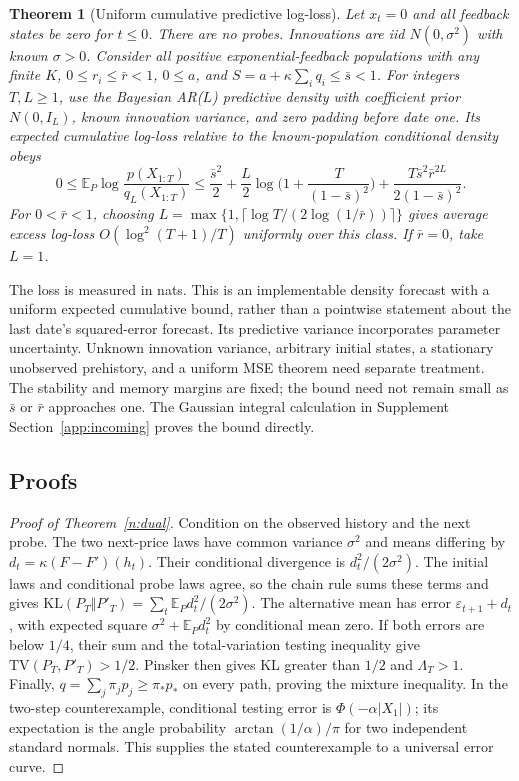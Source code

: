 \documentclass[12pt]{article}
\newtheorem{theorem}{Theorem}[section]
\theoremstyle{definition}
\theoremstyle{remark}
\begin{document}
\begin{theorem}[Uniform cumulative predictive log-loss]\label{n:uniformlog}
Let $x_t=0$ and all feedback states be zero for $t\le0$. There are no probes. Innovations are iid $N(0,\sigma^2)$ with known $\sigma>0$. Consider all positive exponential-feedback populations with any finite $K$, $0\le r_i\le\bar r<1$, $0\le a$, and $S=a+\kappa\sum_iq_i\le\bar s<1$. For integers $T,L\ge1$, use the Bayesian AR($L$) predictive density with coefficient prior $N(0,I_L)$, known innovation variance, and zero padding before date one. Its expected cumulative log-loss relative to the known-population conditional density obeys
\[
0\le\mathbb E_P\log\frac{p(X_{1:T})}{q_L(X_{1:T})}
\le\frac{\bar s^2}{2}+\frac L2\log\Big(1+\frac{T}{(1-\bar s)^2}\Big)
+\frac{T\bar s^2\bar r^{2L}}{2(1-\bar s)^2}.
\]
For $0<\bar r<1$, choosing $L=\max\{1,\lceil\log T/(2\log(1/\bar r))\rceil\}$ gives average excess log-loss $O(\log^2(T+1)/T)$ uniformly over this class. If $\bar r=0$, take $L=1$.
\end{theorem}

The loss is measured in nats. This is an implementable density forecast with a uniform expected cumulative bound, rather than a pointwise statement about the last date's squared-error forecast. Its predictive variance incorporates parameter uncertainty. Unknown innovation variance, arbitrary initial states, a stationary unobserved prehistory, and a uniform MSE theorem need separate treatment. The stability and memory margins are fixed; the bound need not remain small as $\bar s$ or $\bar r$ approaches one. The Gaussian integral calculation in Supplement Section~\ref{app:incoming} proves the bound directly.

\subsection{Proofs}


\begin{proof}[Proof of Theorem~\ref{n:dual}]
Condition on the observed history and the next probe. The two next-price laws have common variance $\sigma^2$ and means differing by $d_t=\kappa(F-F')(h_t)$. Their conditional divergence is $d_t^2/(2\sigma^2)$. The initial laws and conditional probe laws agree, so the chain rule sums these terms and gives $\mathrm{KL}(P_T\Vert P'_T)=\sum_t\mathbb E_Pd_t^2/(2\sigma^2)$. The alternative mean has error $\varepsilon_{t+1}+d_t$, with expected square $\sigma^2+\mathbb E_Pd_t^2$ by conditional mean zero. If both errors are below $1/4$, their sum and the total-variation testing inequality give $\mathrm{TV}(P_T,P'_T)>1/2$. Pinsker then gives KL greater than $1/2$ and $\Lambda_T>1$. Finally, $q=\sum_j\pi_jp_j\ge\pi_*p_*$ on every path, proving the mixture inequality. In the two-step counterexample, conditional testing error is $\Phi(-\alpha|X_1|)$; its expectation is the angle probability $\arctan(1/\alpha)/\pi$ for two independent standard normals. This supplies the stated counterexample to a universal error curve.
\end{proof}
\end{document}
